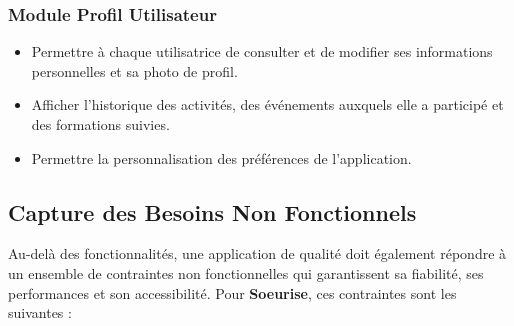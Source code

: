 \documentclass[12pt,a4paper]{report}
\begin{document}
	\subsubsection*{Module Profil Utilisateur}
	\begin{itemize}
		\item Permettre à chaque utilisatrice de consulter et de modifier 
		ses informations personnelles et sa photo de profil.
		\item Afficher l'historique des activités, des événements auxquels 
		elle a participé et des formations suivies.
		\item Permettre la personnalisation des préférences de l'application.
	\end{itemize}
	
	\subsection{Capture des Besoins Non Fonctionnels}
	
	Au-delà des fonctionnalités, une application de qualité doit également répondre 
	à un ensemble de contraintes non fonctionnelles qui garantissent sa fiabilité, 
	ses performances et son accessibilité. Pour \textbf{Soeurise}, ces contraintes 
	sont les suivantes :
	
\end{document}
